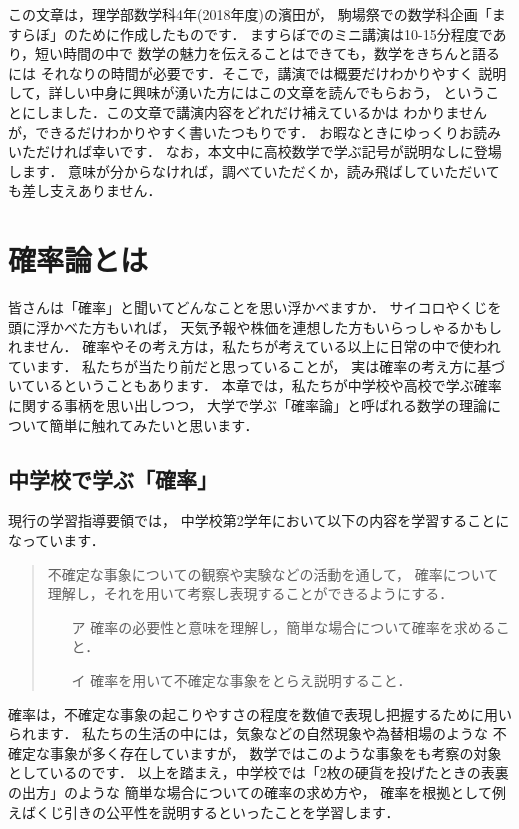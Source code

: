 \documentclass[./main]{subfiles} %
\theoremstyle{definition}
\begin{document}



この文章は，理学部数学科4年(2018年度)の濱田が，
駒場祭での数学科企画「ますらぼ」のために作成したものです．
ますらぼでのミニ講演は10-15分程度であり，短い時間の中で
数学の魅力を伝えることはできても，数学をきちんと語るには
それなりの時間が必要です．そこで，講演では概要だけわかりやすく
説明して，詳しい中身に興味が湧いた方にはこの文章を読んでもらおう，
ということにしました．この文章で講演内容をどれだけ補えているかは
わかりませんが，できるだけわかりやすく書いたつもりです．
お暇なときにゆっくりお読みいただければ幸いです．
なお，本文中に高校数学で学ぶ記号が説明なしに登場します．
意味が分からなければ，調べていただくか，読み飛ばしていただいても差し支えありません．

\section{確率論とは}

皆さんは「確率」と聞いてどんなことを思い浮かべますか．
サイコロやくじを頭に浮かべた方もいれば，
天気予報や株価を連想した方もいらっしゃるかもしれません．
確率やその考え方は，私たちが考えている以上に日常の中で使われています．
私たちが当たり前だと思っていることが，
実は確率の考え方に基づいているということもあります．
本章では，私たちが中学校や高校で学ぶ確率に関する事柄を思い出しつつ，
大学で学ぶ「確率論」と呼ばれる数学の理論について簡単に触れてみたいと思います．

\subsection{中学校で学ぶ「確率」}

現行の学習指導要領では，
中学校第2学年において以下の内容を学習することになっています．
\begin{quote}
不確定な事象についての観察や実験などの活動を通して，
確率について理解し，それを用いて考察し表現することができるようにする．
\begin{itemize}
\item[ア]確率の必要性と意味を理解し，簡単な場合について確率を求めること．
\item[イ]確率を用いて不確定な事象をとらえ説明すること．
\end{itemize}
\end{quote}
確率は，不確定な事象の起こりやすさの程度を数値で表現し把握するために用いられます．
私たちの生活の中には，気象などの自然現象や為替相場のような
不確定な事象が多く存在していますが，
数学ではこのような事象をも考察の対象としているのです．
以上を踏まえ，中学校では「2枚の硬貨を投げたときの表裏の出方」のような
簡単な場合についての確率の求め方や，
確率を根拠として例えばくじ引きの公平性を説明するといったことを学習します．
\end{document}
